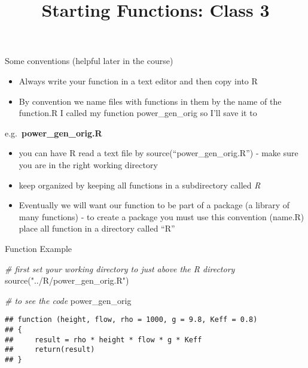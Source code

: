 \documentclass[
  ignorenonframetext,
]{beamer}
\title{Starting Functions: Class 3}
\author{}
\date{\vspace{-2.5em}}
\newenvironment{Shaded}{\begin{snugshade}}{\end{snugshade}}
\newcommand{\CommentTok}[1]{\textcolor[rgb]{0.56,0.35,0.01}{\textit{#1}}}
\newcommand{\FunctionTok}[1]{\textcolor[rgb]{0.00,0.00,0.00}{#1}}
\newcommand{\NormalTok}[1]{#1}
\newcommand{\StringTok}[1]{\textcolor[rgb]{0.31,0.60,0.02}{#1}}
\begin{document}
\frame{\titlepage}

\begin{frame}{Some conventions (helpful later in the course)}
\protect\hypertarget{some-conventions-helpful-later-in-the-course}{}
\begin{itemize}
\item
  Always write your function in a text editor and then copy into R
\item
  By convention we name files with functions in them by the name of the
  function.R I called my function power\_gen\_orig so I'll save it to
\end{itemize}

e.g.~\textbf{power\_gen\_orig.R}

\begin{itemize}
\item
  you can have R read a text file by source(``power\_gen\_orig.R'') -
  make sure you are in the right working directory
\item
  keep organized by keeping all functions in a subdirectory called
  \emph{R}
\item
  Eventually we will want our function to be part of a package (a
  library of many functions) - to create a package you must use this
  convention (name.R) place all function in a directory called ``R''
\end{itemize}
\end{frame}

\begin{frame}[fragile]{Function Example}
\protect\hypertarget{function-example}{}
\begin{Shaded}
\begin{Highlighting}[]
\CommentTok{\# first set your working directory to just above the R directory}
\FunctionTok{source}\NormalTok{(}\StringTok{"../R/power\_gen\_orig.R"}\NormalTok{)}

\CommentTok{\# to see the code}
\NormalTok{power\_gen\_orig}
\end{Highlighting}
\end{Shaded}

\begin{verbatim}
## function (height, flow, rho = 1000, g = 9.8, Keff = 0.8) 
## {
##     result = rho * height * flow * g * Keff
##     return(result)
## }
\end{verbatim}
\end{frame}
\end{document}
